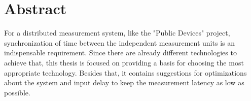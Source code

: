 \chapter*{Abstract}
\label{ch:abstract}


For a distributed measurement system, like the "Public Devices" project, synchronization of time between the independent measurement units is an indispensable requirement. Since there are already different technologies to achieve that, this thesis is focused on providing a basis for choosing the most appropriate technology. Besides that, it contains suggestions for optimizations about the system and input delay to keep the measurement latency as low as possible.

